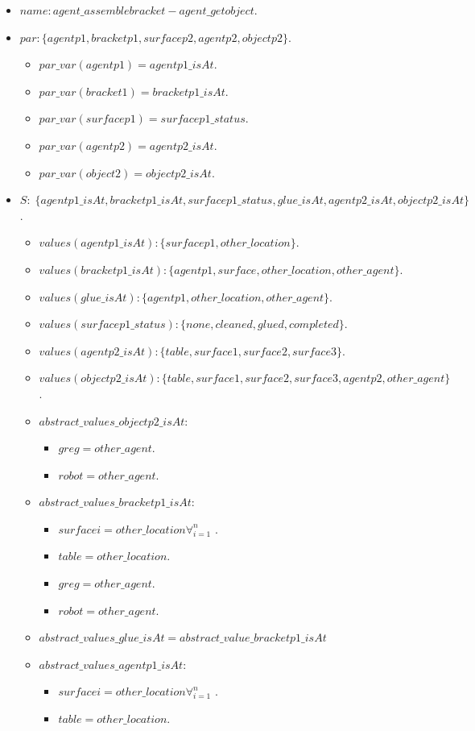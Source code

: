 \begin{itemize}
	\item $name: agent\_assemblebracket-agent\_getobject$.
	\item		$par: \{agentp1,bracketp1,surfacep2,agentp2,objectp2\}$.
		\begin{itemize}
			\item $par\_var(agentp1)=agentp1\_isAt$.
			\item $par\_var(bracket1)=bracketp1\_isAt$.
			\item $par\_var(surfacep1)=surfacep1\_status$.
			\item $par\_var(agentp2)=agentp2\_isAt$.
			\item $par\_var(object2)=objectp2\_isAt$.
		\end{itemize}

	\item $S:\;\{agentp1\_isAt, bracketp1\_isAt,surfacep1\_status, glue\_isAt, agentp2\_isAt, objectp2\_isAt\}$. 
		\begin{itemize}
			\item $values(agentp1\_isAt):\{surfacep1,other\_location\}$.
			\item $values(bracketp1\_isAt):\{agentp1,surface, other\_location,other\_agent\}$. 
			\item $values(glue\_isAt):\{agentp1,other\_location,other\_agent\}$. 
			\item $values(surfacep1\_status):\{none,cleaned,glued,completed\}$.
			\item $values(agentp2\_isAt):\{table,surface1,surface2,surface3\}$.
			\item $values(objectp2\_isAt):\{table,surface1,surface2,surface3,agentp2,other\_agent\}$. 
		\end{itemize}
		\begin{itemize}
			\item $abstract\_values\_objectp2\_isAt:$ 
				\begin{itemize}
					\item $greg=other\_agent$.
					\item $robot=other\_agent$.
				\end{itemize}	
			\item $abstract\_values\_bracketp1\_isAt:$ 
				\begin{itemize}
					\item $surfacei=other\_location \forall_{i=1}^n$ .
					\item $table=other\_location$.
					\item $greg=other\_agent$.
					\item $robot=other\_agent$.
				\end{itemize}	
			\item $abstract\_values\_glue\_isAt=abstract\_value\_bracketp1\_isAt$ 
			\item $abstract\_values\_agentp1\_isAt:$
				\begin{itemize}
					\item $surfacei=other\_location \forall_{i=1}^n$ .
					\item $table=other\_location$.
				\end{itemize}
		\end{itemize}


\end{itemize}

